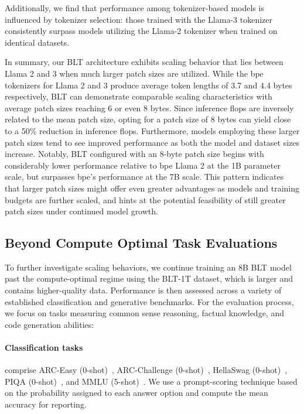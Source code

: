 Additionally, we find that performance among tokenizer-based models is influenced by tokenizer selection: those trained with the Llama-3 tokenizer consistently surpass models utilizing the Llama-2 tokenizer when trained on identical datasets.

In summary, our {\textsc BLT} architecture exhibits scaling behavior that lies between Llama 2 and 3 when much larger patch sizes are utilized. While the bpe tokenizers for Llama 2 and 3 produce average token lengths of 3.7 and 4.4 bytes respectively, {\textsc BLT} can demonstrate comparable scaling characteristics with average patch sizes reaching 6 or even 8 bytes. Since inference flops are inversely related to the mean patch size, opting for a patch size of 8 bytes can yield close to a 50\% reduction in inference flops. Furthermore, models employing these larger patch sizes tend to see improved performance as both the model and dataset sizes increase. Notably, {\textsc BLT} configured with an 8-byte patch size begins with considerably lower performance relative to bpe Llama 2 at the 1B parameter scale, but surpasses bpe’s performance at the 7B scale. This pattern indicates that larger patch sizes might offer even greater advantages as models and training budgets are further scaled, and hints at the potential feasibility of still greater patch sizes under continued model growth.

\subsection{Beyond Compute Optimal Task Evaluations}
\label{section:evals}
To further investigate scaling behaviors, we continue training an 8B {\textsc BLT} model past the compute-optimal regime using the {\textsc BLT}-1T dataset, which is larger and contains higher-quality data. Performance is then assessed across a variety of established classification and generative benchmarks. For the evaluation process, we focus on tasks measuring common sense reasoning, factual knowledge, and code generation abilities:
\paragraph{Classification tasks} comprise ARC-Easy (0-shot)~\citep{Eval_ARC}, ARC-Challenge (0-shot)~\citep{Eval_ARC}, HellaSwag (0-shot)~\citep{Eval_hellaswag}, PIQA (0-shot)~\citep{Eval_piqa}, and MMLU (5-shot)~\citep{hendrycks2020measuring}. We use a prompt-scoring technique based on the probability assigned to each answer option and compute the mean accuracy for reporting.
